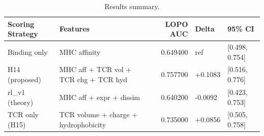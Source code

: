 \begin{table}
\caption{Results summary.}
\label{tab:results}
\begin{tabular}{llrll}
\toprule
Scoring Strategy & Features & LOPO AUC & Delta & 95\% CI \\
\midrule
Binding only & MHC affinity & 0.649400 & ref & [0.498, 0.754] \\
H14 (proposed) & MHC aff + TCR vol + TCR chg + TCR hyd & 0.757700 & +0.1083 & [0.516, 0.776] \\
rl\_v1 (theory) & MHC aff + expr + dissim & 0.640200 & -0.0092 & [0.423, 0.753] \\
TCR only (H15) & TCR volume + charge + hydrophobicity & 0.735000 & +0.0856 & [0.505, 0.758] \\
\bottomrule
\end{tabular}
\end{table}

